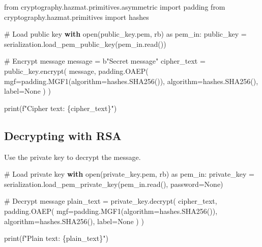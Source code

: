 \documentclass[
  letterpaper,
  DIV=11,
  numbers=noendperiod]{scrreprt}
\newenvironment{Shaded}{\begin{snugshade}}{\end{snugshade}}
\newcommand{\BuiltInTok}[1]{\textcolor[rgb]{0.00,0.23,0.31}{#1}}
\newcommand{\CommentTok}[1]{\textcolor[rgb]{0.37,0.37,0.37}{#1}}
\newcommand{\ControlFlowTok}[1]{\textcolor[rgb]{0.00,0.23,0.31}{\textbf{#1}}}
\newcommand{\ImportTok}[1]{\textcolor[rgb]{0.00,0.46,0.62}{#1}}
\newcommand{\NormalTok}[1]{\textcolor[rgb]{0.00,0.23,0.31}{#1}}
\newcommand{\OperatorTok}[1]{\textcolor[rgb]{0.37,0.37,0.37}{#1}}
\newcommand{\SpecialCharTok}[1]{\textcolor[rgb]{0.37,0.37,0.37}{#1}}
\newcommand{\SpecialStringTok}[1]{\textcolor[rgb]{0.13,0.47,0.30}{#1}}
\newcommand{\StringTok}[1]{\textcolor[rgb]{0.13,0.47,0.30}{#1}}
\newcommand{\VariableTok}[1]{\textcolor[rgb]{0.07,0.07,0.07}{#1}}
\begin{document}
\begin{Shaded}
\begin{Highlighting}[]
\ImportTok{from}\NormalTok{ cryptography.hazmat.primitives.asymmetric }\ImportTok{import}\NormalTok{ padding}
\ImportTok{from}\NormalTok{ cryptography.hazmat.primitives }\ImportTok{import}\NormalTok{ hashes}

\CommentTok{\# Load public key}
\ControlFlowTok{with} \BuiltInTok{open}\NormalTok{(}\StringTok{\textquotesingle{}public\_key.pem\textquotesingle{}}\NormalTok{, }\StringTok{\textquotesingle{}rb\textquotesingle{}}\NormalTok{) }\ImportTok{as}\NormalTok{ pem\_in:}
\NormalTok{    public\_key }\OperatorTok{=}\NormalTok{ serialization.load\_pem\_public\_key(pem\_in.read())}

\CommentTok{\# Encrypt message}
\NormalTok{message }\OperatorTok{=} \StringTok{b"Secret message"}
\NormalTok{cipher\_text }\OperatorTok{=}\NormalTok{ public\_key.encrypt(}
\NormalTok{    message,}
\NormalTok{    padding.OAEP(}
\NormalTok{        mgf}\OperatorTok{=}\NormalTok{padding.MGF1(algorithm}\OperatorTok{=}\NormalTok{hashes.SHA256()),}
\NormalTok{        algorithm}\OperatorTok{=}\NormalTok{hashes.SHA256(),}
\NormalTok{        label}\OperatorTok{=}\VariableTok{None}
\NormalTok{    )}
\NormalTok{)}

\BuiltInTok{print}\NormalTok{(}\SpecialStringTok{f"Cipher text: }\SpecialCharTok{\{}\NormalTok{cipher\_text}\SpecialCharTok{\}}\SpecialStringTok{"}\NormalTok{)}
\end{Highlighting}
\end{Shaded}

\subsection{Decrypting with RSA}\label{decrypting-with-rsa}

Use the private key to decrypt the message.

\begin{Shaded}
\begin{Highlighting}[]
\CommentTok{\# Load private key}
\ControlFlowTok{with} \BuiltInTok{open}\NormalTok{(}\StringTok{\textquotesingle{}private\_key.pem\textquotesingle{}}\NormalTok{, }\StringTok{\textquotesingle{}rb\textquotesingle{}}\NormalTok{) }\ImportTok{as}\NormalTok{ pem\_in:}
\NormalTok{    private\_key }\OperatorTok{=}\NormalTok{ serialization.load\_pem\_private\_key(pem\_in.read(), password}\OperatorTok{=}\VariableTok{None}\NormalTok{)}

\CommentTok{\# Decrypt message}
\NormalTok{plain\_text }\OperatorTok{=}\NormalTok{ private\_key.decrypt(}
\NormalTok{    cipher\_text,}
\NormalTok{    padding.OAEP(}
\NormalTok{        mgf}\OperatorTok{=}\NormalTok{padding.MGF1(algorithm}\OperatorTok{=}\NormalTok{hashes.SHA256()),}
\NormalTok{        algorithm}\OperatorTok{=}\NormalTok{hashes.SHA256(),}
\NormalTok{        label}\OperatorTok{=}\VariableTok{None}
\NormalTok{    )}
\NormalTok{)}

\BuiltInTok{print}\NormalTok{(}\SpecialStringTok{f"Plain text: }\SpecialCharTok{\{}\NormalTok{plain\_text}\SpecialCharTok{\}}\SpecialStringTok{"}\NormalTok{)}
\end{Highlighting}
\end{Shaded}
\end{document}
